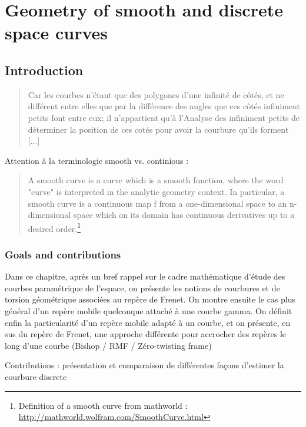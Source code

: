 \chapter{Geometry of smooth and discrete space curves}
\section{Introduction}


\blockcquote[Liebniz]{}{Car les courbes n’étant que des polygones d’une infinité de côtés, et ne différent
entre elles que par la différence des angles que ces côtés infiniment petits font
entre eux; il n’appartient qu’à l’Analyse des infiniment petits de déterminer la
position de ces cotés pour avoir la courbure qu’ils forment [...]}.

Attention à la terminologie smooth vs. continious :

\blockquote{A smooth curve is a curve which is a smooth function, where the word "curve" is interpreted in the analytic geometry context. In particular, a smooth curve is a continuous map f from a one-dimensional space to an n-dimensional space which on its domain has continuous derivatives up to a desired order.\footnote{Definition of a smooth curve from mathworld : \url{http://mathworld.wolfram.com/SmoothCurve.html}}
} 

\subsection{Goals and contributions}
Dans ce chapitre, après un bref rappel sur le cadre mathématique d'étude des courbes paramétrique de l'espace, on présente les notions de courbures et de torsion géométrique associées au repère de Frenet. On montre ensuite le cas plus général d'un repère mobile quelconque attaché à une courbe gamma. On définit enfin la particularité d'un repère mobile adapté à un courbe, et on présente, en sus du repère de Frenet, une approche différente pour accrocher des repères le long d'une courbe (Bishop / RMF / Zéro-twisting frame)

Contributions : présentation et comparaison de différentes façons d'estimer la courbure discrete


